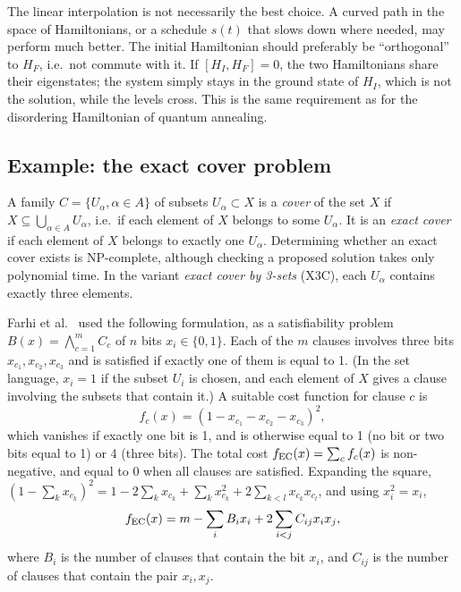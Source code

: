 The linear interpolation is not necessarily the best choice. A curved path in the space of Hamiltonians, or a schedule $s(t)$ that slows down where needed, may perform much better. The initial Hamiltonian should preferably be
``orthogonal'' to $H_F$, i.e.\ not commute with it. If $[H_I,H_F]=0$, the two Hamiltonians share their eigenstates; the system simply stays in the ground state of $H_I$, which is not the solution, while the levels cross.
This is the same requirement as for the disordering Hamiltonian of quantum annealing.

\subsection{Example: the exact cover problem}
A family $C=\{U_\alpha,\alpha\in A\}$ of subsets $U_\alpha\subset X$ is a \emph{cover} of the set $X$ if $X\subseteq\bigcup_{\alpha\in A}U_\alpha$, i.e.\ if each element of $X$ belongs to some $U_\alpha$. It is an \emph{exact cover} if each
element of $X$ belongs to exactly one $U_\alpha$. Determining whether an exact cover exists is NP-complete, although checking a proposed solution takes only polynomial time. In the variant \emph{exact cover by 3-sets} (X3C), each $U_\alpha$
contains exactly three elements.

Farhi et al.\ \cite{Farhi2001} used the following formulation, as a satisfiability problem $B(x)=\bigwedge_{c=1}^mC_c$ of $n$ bits $x_i\in\{0,1\}$. Each of the $m$ clauses involves three bits $x_{c_1},x_{c_2},x_{c_3}$ and is satisfied if
exactly one of them is equal to 1. (In the set language, $x_i=1$ if the subset $U_i$ is chosen, and each element of $X$ gives a clause involving the subsets that contain it.) A suitable cost function for clause $c$ is
\begin{equation}
  f_c(x)=\left(1-x_{c_1}-x_{c_2}-x_{c_3}\right)^2,
\end{equation}
which vanishes if exactly one bit is 1, and is otherwise equal to 1 (no bit or two bits equal to 1) or 4 (three bits). The total cost $f_{\rm EC}(x)=\sum_cf_c(x)$ is non-negative, and equal to 0 when all clauses are satisfied.
Expanding the square, $(1-\sum_kx_{c_k})^2=1-2\sum_kx_{c_k}+\sum_kx_{c_k}^2+2\sum_{k<l}x_{c_k}x_{c_l}$, and using $x_i^2=x_i$,
\begin{equation}
  f_{\rm EC}(x)=m-\sum_iB_ix_i+2\sum_{i<j}C_{ij}x_ix_j,
\end{equation}
where $B_i$ is the number of clauses that contain the bit $x_i$, and $C_{ij}$ is the number of clauses that contain the pair $x_i,x_j$.

